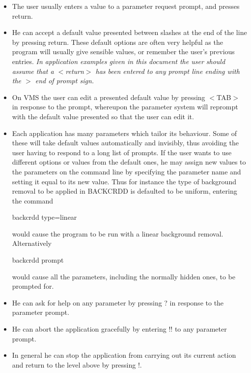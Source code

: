 \documentclass[twoside,11pt]{starlink}
\begin{document}
\begin{itemize}
\item The user usually enters a value to a parameter request prompt, and presses
return.
\item He can accept a default value presented between slashes at the end
of the line by pressing return. These default options are often very
helpful as the program will usually give sensible values, or remember the
user's previous entries. \emph{In application examples given in this document
the user should assume that a $<$return$>$ has been entered to any prompt line
ending with the $>$ end of prompt sign.}
\item On VMS the user can edit a presented default value by pressing $<$TAB$>$
in response to the prompt, whereupon the parameter system will reprompt with
the default value presented so that the user can edit it.
\item Each application has many parameters which tailor its behaviour. Some of
these will take default values automatically and invisibly, thus avoiding the
user having to respond to a long list of prompts. If the user wants to use
different options or values from the default ones, he may assign new values to
the parameters on the command line by specifying the parameter name and setting
it equal to its new value. Thus for instance the type of background removal to
be applied in BACKCRDD is defaulted to be uniform, entering the command
\begin{small}
\begin{terminalv}
backcrdd type=linear
\end{terminalv}
\end{small}
would cause the program to be run with a linear background removal.
Alternatively
\begin{small}
\begin{terminalv}
backcrdd prompt
\end{terminalv}
\end{small}
would cause all the parameters, including the normally hidden ones, to be
prompted for.
\item He can ask for help on any parameter by pressing ? in response to
the parameter prompt.
\item He can abort the application gracefully by entering !! to any
parameter prompt.
\item In general he can stop the application from carrying out its current
action and return to the level above by pressing !.
\end{itemize}
\end{document}
